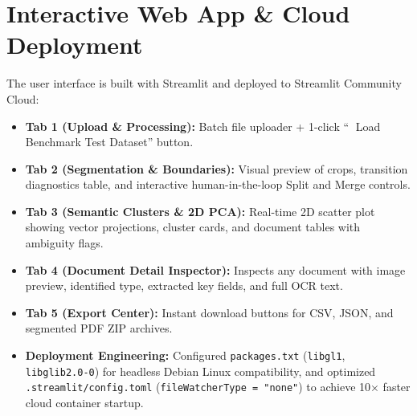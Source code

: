 \documentclass[11pt,a4paper]{article}
\begin{document}
\section{Interactive Web App \& Cloud Deployment}
The user interface is built with Streamlit and deployed to Streamlit Community Cloud:
\begin{itemize}[leftmargin=*, noitemsep]
    \item \textbf{Tab 1 (Upload \& Processing):} Batch file uploader + 1-click ``🚀 Load Benchmark Test Dataset'' button.
    \item \textbf{Tab 2 (Segmentation \& Boundaries):} Visual preview of crops, transition diagnostics table, and interactive human-in-the-loop Split and Merge controls.
    \item \textbf{Tab 3 (Semantic Clusters \& 2D PCA):} Real-time 2D scatter plot showing vector projections, cluster cards, and document tables with ambiguity flags.
    \item \textbf{Tab 4 (Document Detail Inspector):} Inspects any document with image preview, identified type, extracted key fields, and full OCR text.
    \item \textbf{Tab 5 (Export Center):} Instant download buttons for CSV, JSON, and segmented PDF ZIP archives.
    \item \textbf{Deployment Engineering:} Configured \texttt{packages.txt} (\texttt{libgl1}, \texttt{libglib2.0-0}) for headless Debian Linux compatibility, and optimized \texttt{.streamlit/config.toml} (\texttt{fileWatcherType = "none"}) to achieve 10$\times$ faster cloud container startup.
\end{itemize}
\end{document}
